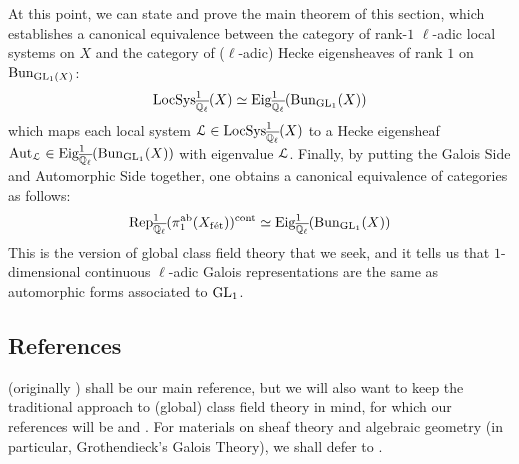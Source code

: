             At this point, we can state and prove the main theorem of this section, which establishes a canonical equivalence between the category of rank-$1$ $\ell$-adic local systems on $X$ and the category of ($\ell$-adic) Hecke eigensheaves of rank $1$ on $\mathrm{Bun}_{\operatorname{GL}_1(X)}$:
                $$\mathrm{LocSys}_{\overline{\mathbb{Q}_{\ell}}}^1(X) \simeq \mathrm{Eig}^1_{\overline{\mathbb{Q}_{\ell}}}(\mathrm{Bun}_{\operatorname{GL}_1}(X))$$
            which maps each local system $\mathcal{L} \in \mathrm{LocSys}_{\overline{\mathbb{Q}_{\ell}}}^1(X)$ to a Hecke eigensheaf $\mathrm{Aut}_{\mathcal{L}} \in \mathrm{Eig}^1_{\overline{\mathbb{Q}_{\ell}}}(\mathrm{Bun}_{\operatorname{GL}_1}(X))$ with eigenvalue $\mathcal{L}$. Finally, by putting the Galois Side and Automorphic Side together, one obtains a canonical equivalence of categories as follows:
                $$\mathrm{Rep}_{\overline{\mathbb{Q}_{\ell}}}^1(\pi_1^{\mathrm{ab}}(X_{\mathrm{f\acute{e}t}}))^{\mathrm{cont}} \simeq \mathrm{Eig}^1_{\overline{\mathbb{Q}_{\ell}}}(\mathrm{Bun}_{\operatorname{GL}_1}(X))$$
            This is the version of global class field theory that we seek, and it tells us that $1$-dimensional continuous $\ell$-adic Galois representations are the same as automorphic forms associated to $\operatorname{GL}_1$.
	    
        \subsection{References}
    	    \cite{tendler_2015_geometric_class_field_theory} (originally \cite{tendler_2010_geometric_class_field_theory_original}) shall be our main reference, but we will also want to keep the traditional approach to (global) class field theory in mind, for which our references will be \cite[Chapter VI]{neukirch_2010_algebraic_number_theory} and \cite[Chapter VIII]{neukirch_1999_cohomology_of_number_field}. For materials on sheaf theory and algebraic geometry (in particular, Grothendieck's Galois Theory), we shall defer to \cite{stacks}. 
    	    
	\printbibliography

